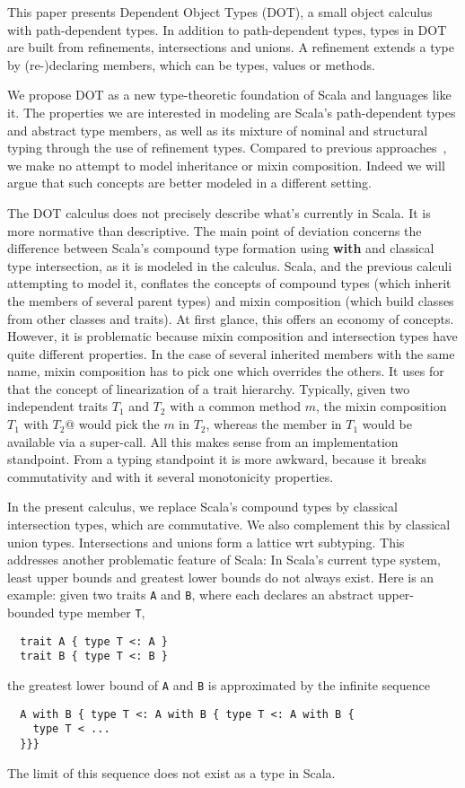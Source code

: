 \documentclass[9pt]{sigplanconf}
\def\code{\lstinline}  % shorter version so you can write \code|String[Foo]|
\begin{document}
This paper presents Dependent Object Types (DOT), a small object
calculus with path-dependent types. In addition to path-dependent
types, types in DOT are built from refinements, intersections and
unions. A refinement extends a type by (re-)declaring members, which
can be types, values or methods.

We propose DOT as a new type-theoretic foundation of Scala and
languages like it. The properties we are interested in modeling are
Scala's path-dependent types and abstract type members, as well as its
mixture of nominal and structural typing through the use of refinement
types. Compared to previous approaches~\cite{nuObj,FS}, we make no
attempt to model inheritance or mixin composition. Indeed we will
argue that such concepts are better modeled in a different setting.

The DOT calculus does not precisely describe what's currently in Scala. It
is more normative than descriptive. The main point of deviation
concerns the difference between Scala's compound type formation using
{\bf with} and classical type intersection, as it is modeled in the
calculus. Scala, and the previous calculi attempting to model it,
conflates the concepts of compound types (which inherit the members of
several parent types) and mixin composition (which build classes from
other classes and traits). At first glance, this offers an economy of
concepts. However, it is problematic because mixin composition and
intersection types have quite different properties. In the case of
several inherited members with the same name, mixin composition has to
pick one which overrides the others. It uses for that the concept of
linearization of a trait hierarchy. Typically, given two independent
traits $T_1$ and $T_2$ with a common method $m$, the mixin composition
\code@$T_1$ with $T_2$@ would pick the $m$ in $T_2$, whereas the member in
$T_1$ would be available via a super-call. All this makes sense from
an implementation standpoint. From a typing standpoint it is more
awkward, because it breaks commutativity and with it several
monotonicity properties.

In the present calculus, we replace Scala's compound types by
classical intersection types, which are commutative. We also
complement this by classical union types. Intersections and unions
form a lattice wrt subtyping. This addresses another problematic
feature of Scala: In Scala's current type system, least upper bounds
and greatest lower bounds do not always exist. Here is an example:
given two traits \code{A} and \code{B}, where each declares an
abstract upper-bounded type member \code{T},
\begin{lstlisting}
  trait A { type T <: A }
  trait B { type T <: B }
\end{lstlisting}
the greatest lower bound of \code{A} and \code{B} is approximated by the
infinite sequence
\begin{lstlisting}
  A with B { type T <: A with B { type T <: A with B {
    type T < ...
  }}}
\end{lstlisting}
The limit of this sequence does not exist as a type in Scala.
\end{document}
